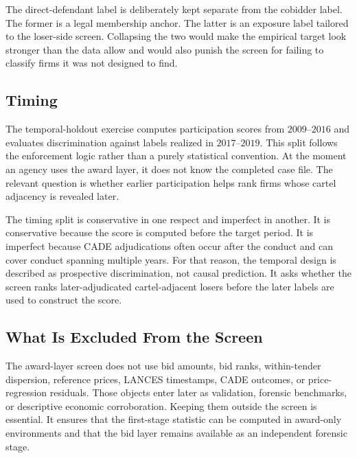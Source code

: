 The direct-defendant label is deliberately kept separate from the
cobidder label. The former is a legal membership anchor. The
latter is an exposure label tailored to the loser-side screen.
Collapsing the two would make the empirical target look stronger
than the data allow and would also punish the screen for failing
to classify firms it was not designed to find.

\subsection{Timing}
\label{app:timing_v18}

The temporal-holdout exercise computes participation scores from
$2009$--$2016$ and evaluates discrimination against labels
realized in $2017$--$2019$. This split follows the enforcement
logic rather than a purely statistical convention. At the moment
an agency uses the award layer, it does not know the completed
case file. The relevant question is whether earlier participation
helps rank firms whose cartel adjacency is revealed later.

The timing split is conservative in one respect and imperfect in
another. It is conservative because the score is computed before
the target period. It is imperfect because CADE adjudications
often occur after the conduct and can cover conduct spanning
multiple years. For that reason, the temporal design is described
as prospective discrimination, not causal prediction. It asks
whether the screen ranks later-adjudicated cartel-adjacent
losers before the later labels are used to construct the score.

\subsection{What Is Excluded From the Screen}
\label{app:excluded_screen_v18}

The award-layer screen does not use bid amounts, bid ranks,
within-tender dispersion, reference prices, LANCES timestamps,
CADE outcomes, or price-regression residuals. Those objects enter
later as validation, forensic benchmarks, or descriptive economic
corroboration. Keeping them outside the screen is essential. It
ensures that the first-stage statistic can be computed in
award-only environments and that the bid layer remains available
as an independent forensic stage.
